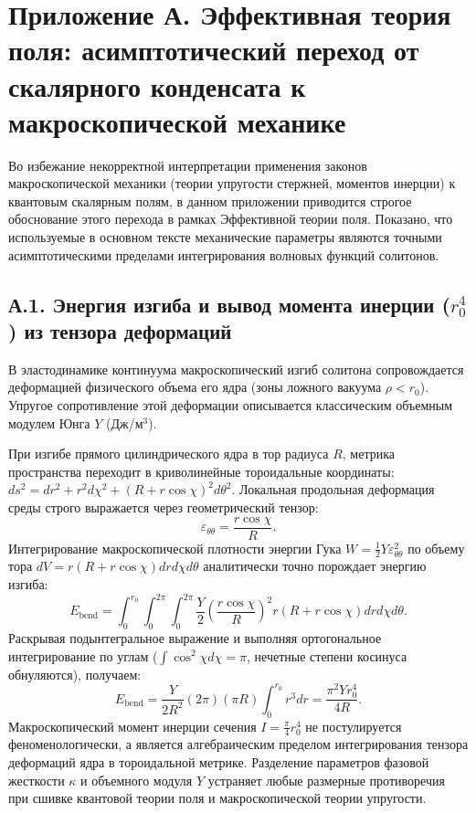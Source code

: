 \documentclass[11pt,a4paper]{article}
\begin{document}
	\section*{Приложение А. Эффективная теория поля: асимптотический переход от скалярного конденсата к макроскопической механике}
	Во избежание некорректной интерпретации применения законов макроскопической механики (теории упругости стержней, моментов инерции) к квантовым скалярным полям, в данном приложении приводится строгое обоснование этого перехода в рамках Эффективной теории поля. Показано, что используемые в основном тексте механические параметры являются точными асимптотическими пределами интегрирования волновых функций солитонов.
	
	\subsection*{А.1. Энергия изгиба и вывод момента инерции ($r_0^4$) из тензора деформаций}
	В эластодинамике континуума макроскопический изгиб солитона сопровождается деформацией физического объема его ядра (зоны ложного вакуума $\rho < r_0$). Упругое сопротивление этой деформации описывается классическим объемным модулем Юнга $Y$ (Дж/м$^3$).
	
	При изгибе прямого цилиндрического ядра в тор радиуса $R$, метрика пространства переходит в криволинейные тороидальные координаты: $ds^2 = dr^2 + r^2 d\chi^2 + (R + r\cos\chi)^2 d\theta^2$.
	Локальная продольная деформация среды строго выражается через геометрический тензор:
	\begin{equation}
		\varepsilon_{\theta\theta} = \frac{r \cos\chi}{R}.
	\end{equation}
	Интегрирование макроскопической плотности энергии Гука $W = \frac{1}{2} Y \varepsilon_{\theta\theta}^2$ по объему тора $dV = r(R + r\cos\chi) dr d\chi d\theta$ аналитически точно порождает энергию изгиба:
	\begin{equation}
		E_{\text{bend}} = \int_0^{r_0} \int_0^{2\pi} \int_0^{2\pi} \frac{Y}{2} \left( \frac{r \cos\chi}{R} \right)^2 r(R + r\cos\chi) dr d\chi d\theta.
	\end{equation}
	Раскрывая подынтегральное выражение и выполняя ортогональное интегрирование по углам ($\int \cos^2\chi d\chi = \pi$, нечетные степени косинуса обнуляются), получаем:
	\begin{equation}
		E_{\text{bend}} = \frac{Y}{2 R^2} (2\pi) (\pi R) \int_0^{r_0} r^3 dr = \frac{\pi^2 Y r_0^4}{4 R}.
	\end{equation}
	Макроскопический момент инерции сечения $I = \frac{\pi}{4} r_0^4$ не постулируется феноменологически, а является алгебраическим пределом интегрирования тензора деформаций ядра в тороидальной метрике. Разделение параметров фазовой жесткости $\kappa$ и объемного модуля $Y$ устраняет любые размерные противоречия при сшивке квантовой теории поля и макроскопической теории упругости.
	
\end{document}
